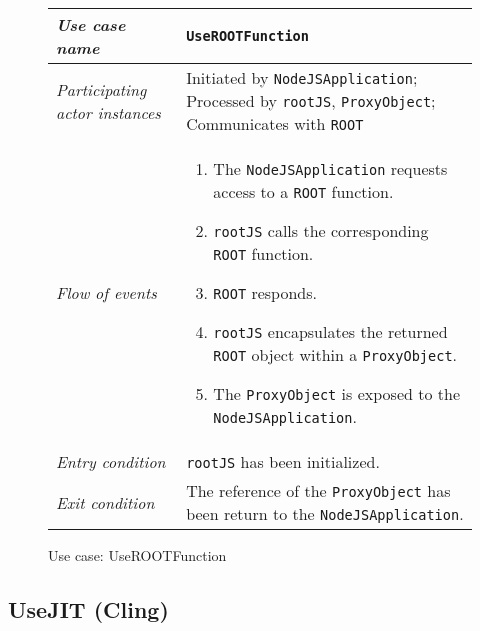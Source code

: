 \begin{figure}[htb]
	\centering
	\begin{longtable}{p{3cm} @{\hskip 1cm} p{12cm}}
		\hline

		\textit{Use case name} & \texttt{UseROOTFunction}\\
		\hline

		\textit{Participating actor instances} & Initiated by \texttt{NodeJSApplication};
                Processed by \texttt{rootJS}, \texttt{ProxyObject};
                Communicates with \texttt{ROOT}\\
		\hline

		\textit{Flow of events} &
			\begin{enumerate}
				\item The \texttt{NodeJSApplication} requests access to a \texttt{ROOT} function.

				\item \texttt{rootJS} calls the corresponding \texttt{ROOT} function.

				\item \texttt{ROOT} responds.

				\item \texttt{rootJS} encapsulates the returned \texttt{ROOT} object within a \texttt{ProxyObject}.

				\item The \texttt{ProxyObject} is exposed to the \texttt{NodeJSApplication}.
			\end{enumerate}
			\\
		\hline

		\textit{Entry condition} & \texttt{rootJS} has been initialized.\\
		\hline

		\textit{Exit condition} & The reference of the \texttt{ProxyObject} has been return to the \texttt{NodeJSApplication}.\\
        \hline
	\end{longtable}

	\caption{Use case: UseROOTFunction}
\end{figure}

\pagebreak

\subsection{UseJIT (Cling)}

